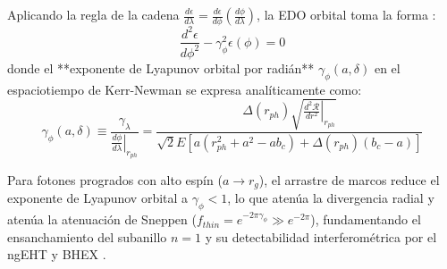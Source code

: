 Aplicando la regla de la cadena $\frac{d\epsilon}{d\lambda} = \frac{d\epsilon}{d\phi} \left( \frac{d\phi}{d\lambda} \right)$, la EDO orbital toma la forma \citep{Sneppen}:
\begin{equation}
    \frac{d^2\epsilon}{d\phi^2} - \gamma_\phi^2 \epsilon(\phi) = 0
    \label{eq:oscilador_orbital_phi_KN}
\end{equation}
donde el **exponente de Lyapunov orbital por radián** $\gamma_\phi(a, \delta)$ en el espaciotiempo de Kerr-Newman se expresa analíticamente como:
\begin{equation}
    \gamma_\phi(a, \delta) \equiv \frac{\gamma_\lambda}{\left.\frac{d\phi}{d\lambda}\right|_{r_{ph}}} = \frac{\Delta(r_{ph}) \sqrt{\left.\frac{d^2\mathcal{R}}{dr^2}\right|_{r_{ph}}}}{\sqrt{2} E \left[ a \left( r_{ph}^2 + a^2 - a b_c \right) + \Delta(r_{ph}) \left( b_c - a \right) \right]}
    \label{eq:def_gamma_phi_KN_exacto}
\end{equation}

Para fotones progrados con alto espín ($a \to r_g$), el arrastre de marcos reduce el exponente de Lyapunov orbital a $\gamma_\phi < 1$, lo que atenúa la divergencia radial y atenúa la atenuación de Sneppen ($f_{thin} = e^{-2\pi\gamma_\phi} \gg e^{-2\pi}$), fundamentando el ensanchamiento del subanillo $n=1$ y su detectabilidad interferométrica por el ngEHT y BHEX \citep{2406.09498v1}.

